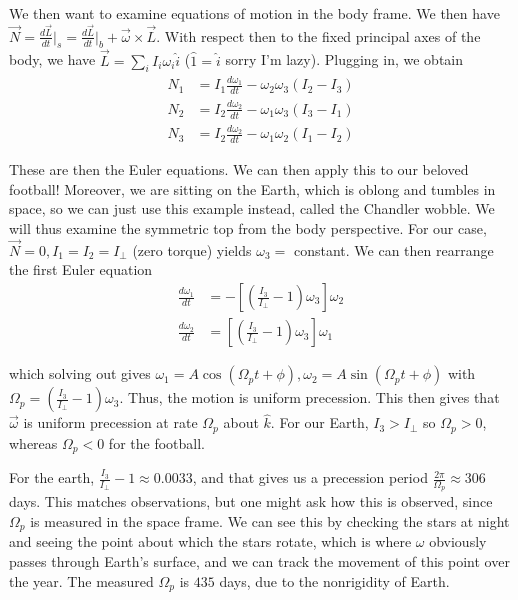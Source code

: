 \documentclass[10pt]{report}
\newcommand{\rd}[2]{\frac{d#1}{d#2}}
\begin{document}
We then want to examine equations of motion in the body frame. We then have $\vec{N} = \rd{\vec{L}}{t}\Big|_s = \rd{\vec{L}}{t} \Big|_b + \vec{\omega}\times \vec{L}$. With respect then to the fixed principal axes of the body, we have $\vec{L} = \sum_i I_i\omega_i\hat{i}$ ($\hat{1} = \hat{i}$ sorry I'm lazy). Plugging in, we obtain
\begin{align*}
    N_1 &= I_1 \rd{\omega_1}{t} - \omega_2 \omega_3 \left( I_2 - I_3 \right)\\
    N_2 &= I_2 \rd{\omega_2}{t} - \omega_1 \omega_3 \left( I_3 - I_1 \right)\\
    N_3 &= I_2 \rd{\omega_2}{t} - \omega_1 \omega_2 \left( I_1 - I_2 \right)
\end{align*}

These are then the Euler equations. We can then apply this to our beloved football! Moreover, we are sitting on the Earth, which is oblong and tumbles in space, so we can just use this example instead, called the Chandler wobble. We will thus examine the symmetric top from the body perspective. For our case, $\vec{N} = 0, I_1 = I_2 = I_{\perp}$ (zero torque) yields $\omega_3 = $ constant. We can then rearrange the first Euler equation
\begin{align*}
    \rd{\omega_1}{t} &= -\left[ \left( \frac{I_3}{I_\perp} - 1 \right)\omega_3 \right]\omega_2\\
    \rd{\omega_2}{t} &= \left[ \left( \frac{I_3}{I_\perp} - 1 \right)\omega_3 \right]\omega_1
\end{align*}

which solving out gives $\omega_1 = A\cos\left( \Omega_p t + \phi \right), \omega_2 = A\sin\left( \Omega_p t + \phi \right)$ with $\Omega_p = \left( \frac{I_3}{I_\perp}  - 1\right)\omega_3$. Thus, the motion is uniform precession. This then gives that $\vec{\omega}$ is uniform precession at rate $\Omega_p$ about $\hat{k}$. For our Earth, $I_3 > I_\perp$ so $\Omega_p > 0$, whereas $\Omega_p < 0$ for the football.

For the earth, $\frac{I_3}{I_\perp} - 1 \approx 0.0033$, and that gives us a precession period $\frac{2\pi}{\Omega_p} \approx 306$ days. This matches observations, but one might ask how this is observed, since $\Omega_p$ is measured in the space frame. We can see this by checking the stars at night and seeing the point about which the stars rotate, which is where $\omega$ obviously passes through Earth's surface, and we can track the movement of this point over the year. The measured $\Omega_p$ is $435$ days, due to the nonrigidity of Earth.
\end{document}
